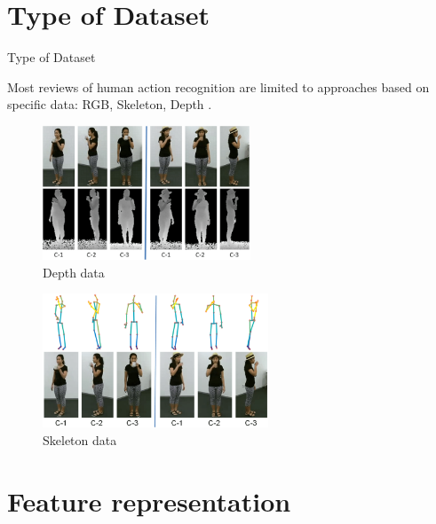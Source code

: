 \section{Type of Dataset}
\begin{frame}{Type of Dataset}

    Most reviews of human action recognition are limited to approaches based on specific data: RGB, Skeleton, Depth \cite{shahroudy2016ntu}.

    \begin{multicols}{2}
        \begin{figure}[htp]
            \centering
            \includegraphics[height=4cm]{images/v1survey/depth_data_ex.png}
            \caption{Depth data}
            \label{fig:depth_data_ex}
        \end{figure}
        \begin{figure}[htp]
            \centering
            \includegraphics[height=4cm]{images/v1survey/skeleton_data_ex.png}
            \caption{Skeleton data}
            \label{fig:skeleton_data_ex}
        \end{figure}
    \end{multicols}
\end{frame}

\section{Feature representation}
